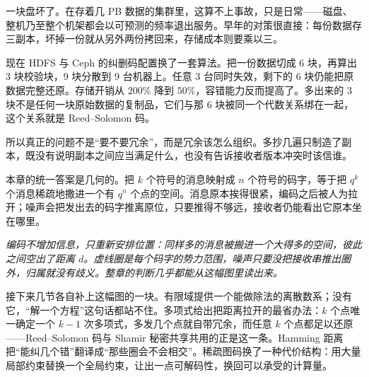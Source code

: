 一块盘坏了。在存着几 PB 数据的集群里，这算不上事故，只是日常——磁盘、整机乃至整个机架都会以可预测的频率退出服务。早年的对策很直接：每份数据存三副本，坏掉一份就从另外两份拷回来，存储成本则要乘以三。

现在 HDFS 与 Ceph 的纠删码配置换了一套算法。把一份数据切成 6 块，再算出 3 块校验块，9 块分散到 9 台机器上。任意 3 台同时失效，剩下的 6 块仍能把原数据完整还原。存储开销从 \(200\%\) 降到 \(50\%\)，容错能力反而提高了。多出来的 3 块不是任何一块原始数据的复制品，它们与那 6 块被同一个代数关系绑在一起，这个关系就是 Reed--Solomon 码。

所以真正的问题不是``要不要冗余''，而是冗余该怎么组织。多抄几遍只制造了副本，既没有说明副本之间应当满足什么，也没有告诉接收者版本冲突时该信谁。

本章的统一答案是几何的。把 \(k\) 个符号的消息映射成 \(n\) 个符号的码字，等于把 \(q^k\) 个消息稀疏地撒进一个有 \(q^n\) 个点的空间。消息原本挨得很紧，编码之后被人为拉开；噪声会把发出去的码字推离原位，只要推得不够远，接收者仍能看出它原本坐在哪里。

\begin{center}

\emph{编码不增加信息，只重新安排位置：同样多的消息被搬进一个大得多的空间，彼此之间空出了距离 \(d\)。虚线圈是每个码字的势力范围，噪声只要没把接收串推出圈外，归属就没有歧义。整章的判断几乎都能从这幅图里读出来。}
\end{center}

接下来几节各自补上这幅图的一块。有限域提供一个能做除法的离散数系；没有它，``解一个方程''这句话都站不住。多项式给出把距离拉开的最省办法：\(k\) 个点唯一确定一个 \(k-1\) 次多项式，多发几个点就自带冗余，而任意 \(k\) 个点都足以还原——Reed--Solomon 码与 Shamir 秘密共享共用的正是这一条。Hamming 距离把``能纠几个错''翻译成``那些圈会不会相交''。稀疏图码换了一种代价结构：用大量局部约束替换一个全局约束，让出一点可解码性，换回可以承受的计算量。

